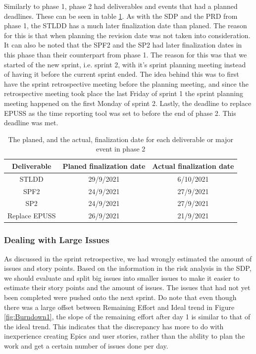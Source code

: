 \documentclass{article}
\begin{document}
Similarly to phase 1, phase 2 had deliverables and events that had a planned deadlines. These can be seen in table \ref{tab:deadlines2}. As with the SDP and the PRD from phase 1, the STLDD has a much later finalization date than planed. The reason for this is that when planning the revision date was not taken into consideration. It can also be noted that the SPF2 and the SP2 had later finalization dates in this phase than their counterpart from phase 1. The reason for this was that we started of the new sprint, i.e. sprint 2, with it's sprint planning meeting instead of having it before the current sprint ended. The idea behind this was to first have the sprint retrospective meeting before the planning meeting, and since the retrospective meeting took place the last Friday of sprint 1 the sprint planning meeting happened on the first Monday of sprint 2. Lastly, the deadline to replace EPUSS as the time reporting tool was set to before the end of phase 2. This deadline was met. 
\begin{table}[h!]
    \centering
    \begin{tabular}{|c|c|c|}
    \hline
    Deliverable & Planed finalization date & Actual finalization date \\ \hline\hline
    STLDD & 29/9/2021 & 6/10/2021 \\ \hline
    SPF2 & 24/9/2021 & 27/9/2021 \\ \hline
    SP2 & 24/9/2021 & 27/9/2021 \\ \hline
    Replace EPUSS & 26/9/2021 & 21/9/2021 \\ \hline
    \end{tabular}
    \caption{The planed, and the actual, finalization date for each deliverable or major event in phase 2}
    \label{tab:deadlines2}
\end{table}

\subsubsection{Dealing with Large Issues}
As discussed in the sprint retrospective, we had wrongly estimated the amount of issues and story points. Based on the information in the risk analysis in the SDP, we should evaluate and split big issues into smaller issues to make it easier to estimate their story points and the amount of issues. The issues that had not yet been completed were pushed onto the next sprint. Do note that even though there was a large offset between Remaining Effort and Ideal trend in Figure \ref{fig:Burndown1}, the slope of the remaining effort after day 1 is similar to that of the ideal trend. This indicates that the discrepancy has more to do with inexperience creating Epics and user stories, rather than the ability to plan the work and get a certain number of issues done per day.
\end{document}
